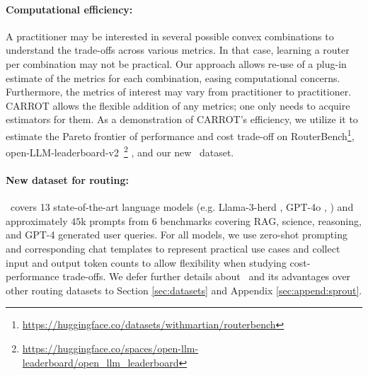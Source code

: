 
\paragraph{Computational efficiency:} A practitioner may be interested in several possible convex combinations to understand the trade-offs across various metrics. In that case, learning a router per combination may not be practical. Our approach allows re-use of a plug-in estimate of the metrics for each combination, easing computational concerns. Furthermore, the metrics of interest may vary from practitioner to practitioner. CARROT allows the flexible addition of any metrics; one only needs to acquire estimators for them. As a demonstration of CARROT's efficiency, we utilize it to estimate the Pareto frontier of performance and cost trade-off on 
{RouterBench}\footnote{\url{https://huggingface.co/datasets/withmartian/routerbench}}\citep{hu2024routerbench}, open-LLM-leaderboard-v2\
\footnote{\url{https://huggingface.co/spaces/open-llm-leaderboard/open\_llm\_leaderboard}} \citep{open-llm-leaderboard-v2}, and our new \newdata\ dataset.

\paragraph{New dataset for routing:} \newdata\ covers 13 state-of-the-art language models (e.g. Llama-3-herd \citep{grattafiori2024llama3herdmodels}, GPT-4o \citep{openai2024gpt4}, \etc ) and approximately $45$k prompts from 6 benchmarks covering RAG, science, reasoning, and GPT-4 generated user queries. For all models, we use zero-shot prompting and corresponding chat templates to represent practical use cases and collect input and output token counts to allow flexibility when studying cost-performance trade-offs. We defer further details about \newdata\ and its advantages over other routing datasets to Section \ref{sec:datasets} and Appendix \ref{sec:append:sprout}.


